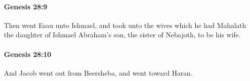 		\paragraph{Genesis 28:9} %
			\label{GENESIS-28-9}

			Then went Esau unto Ishmael, and took unto the wives which he had Mahalath the daughter of Ishmael Abraham's son, the sister of Nebajoth, to be his wife.


		\paragraph{Genesis 28:10} %
			\label{GENESIS-28-10}

			And Jacob went out from Beersheba, and went toward Haran.


